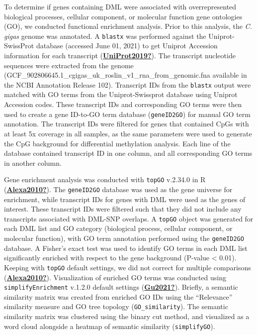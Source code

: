 \documentclass [11pt, proquest] {uwthesis}[2015/03/03]
\begin{document}
To determine if genes containing DML were associated with overrepresented biological processes, cellular component, or molecular function gene ontologies (GO), we conducted functional enrichment analysis. Prior to this analysis, the \emph{C. gigas} genome was annotated. A \texttt{blastx} was performed against the Uniprot-SwissProt database (accessed June 01, 2021) to get Uniprot Accession information for each transcript (\protect\hyperlink{ref-UniProt2019}{\textbf{UniProt2019?}}). The transcript nucleotide sequences were extracted from the genome (GCF\_902806645.1\_cgigas\_uk\_roslin\_v1\_rna\_from\_genomic.fna available in the NCBI Annotation Release 102). Transcript IDs from the \texttt{blastx} output were matched with GO terms from the Uniprot-Swissprot database using Uniprot Accession codes. These transcript IDs and corresponding GO terms were then used to create a gene ID-to-GO term database (\texttt{geneID2GO}) for manual GO term annotation. The transcript IDs were filtered for genes that contained CpGs with at least 5x coverage in all samples, as the same parameters were used to generate the CpG background for differential methylation analysis. Each line of the database contained transcript ID in one column, and all corresponding GO terms in another column.

Gene enrichment analysis was conducted with \texttt{topGO} v.2.34.0 in R (\protect\hyperlink{ref-Alexa2010}{\textbf{Alexa2010?}}). The \texttt{geneID2GO} database was used as the gene universe for enrichment, while transcript IDs for genes with DML were used as the genes of interest. These transcript IDs were filtered such that they did not include any transcripts associated with DML-SNP overlaps. A \texttt{topGO} object was generated for each DML list and GO category (biological process, cellular component, or molecular function), with GO term annotation performed using the \texttt{geneID2GO} database. A Fisher's exact test was used to identify GO terms in each DML list significantly enriched with respect to the gene background (P-value \textless{} 0.01). Keeping with \texttt{topGO} default settings, we did not correct for multiple comparisons (\protect\hyperlink{ref-Alexa2010}{\textbf{Alexa2010?}}). Visualization of enriched GO terms was conducted using \texttt{simplifyEnrichment} v.1.2.0 default settings (\protect\hyperlink{ref-Gu2021}{\textbf{Gu2021?}}). Briefly, a semantic similarity matrix was created from enriched GO IDs using the ``Relevance'' similarity measure and GO tree topology (\texttt{GO\_similarity}). The semantic similarity matrix was clustered using the binary cut method, and visualized as a word cloud alongside a heatmap of semantic similarity (\texttt{simplifyGO}).
\end{document}
